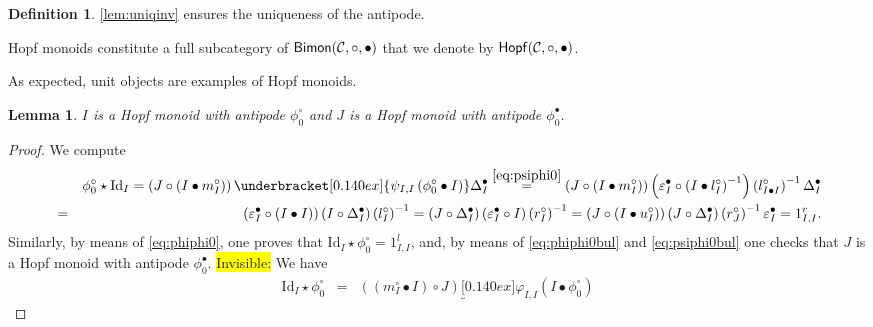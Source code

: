 \documentclass[nosumlimits,twoside]{amsart}
\newtheorem{lemma}[lemma]{\sc Lemma}
\theoremstyle{definition}
\newtheorem{definition}[definition]{\sc Definition}
\theoremstyle{remark}
\newenvironment{invisible}{{\noindent\sc \colorbox{yellow}{Invisible:}\;}\color{gray}}{\medskip}
\newcommand{\Cc}{\mathcal{C}}
\def\Bimon{{\sf Bimon}}
\def\Hopfmon{{\sf Hopf}}
\begin{document}
\begin{definition}
\cref{lem:uniqinv} ensures the uniqueness of the antipode.

Hopf monoids constitute a full subcategory of $\Bimon(\Cc,\circ,\bullet)$ that we denote by $\Hopfmon(\Cc,\circ,\bullet)$.
\end{definition}

As expected, unit objects are examples of Hopf monoids.

\begin{lemma}
\label{lem:IHopf} $I$ is a Hopf monoid with antipode $\phi _{0}^{\circ}$ and $J$ is a Hopf monoid with antipode $\phi _{0}^{\bullet }$.
\end{lemma}

\begin{proof}
We compute%
\begin{eqnarray*}
&&\phi _{0}^{\circ}\star \mathrm{Id}_{I} =\left( J\circ \left( I\bullet m_{I}^{\circ
}\right) \right) \underbracket[0.140ex]{\psi _{I,I}\left( \phi _{0}^{\circ}\bullet I\right)} \Delta
_{I}^{\bullet }\overset{\eqref{eq:psiphi0}}=
\left( J\circ \left( I\bullet m_{I}^{\circ
}\right) \right) \left(\varepsilon _{I}^{\bullet }\circ \left( I\bullet
l_{I}^{\circ }\right) ^{-1}\right) \left( l_{I\bullet I}^{\circ }\right)
^{-1} \Delta
_{I}^{\bullet }\\
&=&%
\left( \varepsilon _{I}^{\bullet }\circ \left( I\bullet I\right) \right)
\left( I\circ \Delta _{I}^{\bullet }\right) \left( l_{I}^{\circ }\right)^{-1} =
\left( J\circ \Delta _{I}^{\bullet }\right) \left( \varepsilon
_{I}^{\bullet }\circ I\right) \left( r_{I}^{\circ }\right) ^{-1} 
=%
\left( J\circ \left( I\bullet u_{I}^{\circ
}\right) \right) \left( J\circ \Delta _{I}^{\bullet }\right) \left(
r_{J}^{\circ }\right) ^{-1}\varepsilon _{I}^{\bullet }=1_{I,I}^{r}.
\end{eqnarray*}%
Similarly, by means of \eqref{eq:phiphi0}, one proves that $\mathrm{Id}_{I}\star \phi _{0}^{\circ}=1_{I,I}^{l}$, and, by means of \eqref{eq:phiphi0bul} and \eqref{eq:psiphi0bul} one checks that
$J$ is a Hopf monoid with antipode $\phi _{0}^{\bullet }$.
\begin{invisible}
We have
\begin{eqnarray*}
\mathrm{Id}_{I}\star \phi _{0}^{\circ} &=&\left( \left( m_{I}^{\circ }\bullet
I\right) \circ J\right) \underbracket[0.140ex]{\varphi _{I,I}\left( I\bullet \phi _{0}^{\circ}\right)}

\end{eqnarray*}
\end{invisible}
\end{proof}
\end{document}
